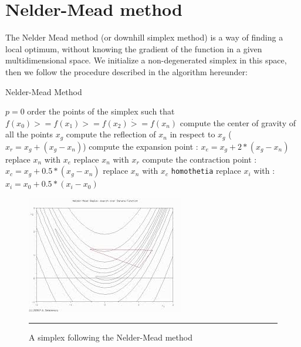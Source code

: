 \section{Nelder-Mead method}

The Nelder Mead method \cite{simplex} (or downhill simplex method) is a way of finding a local optimum, without knowing the gradient of the function in a given multidimensional space. We initialize a non-degenerated simplex in this space, then we follow the procedure described in the algorithm hereunder:

\begin{algorithm}
    \caption{Nelder-Mead Method}
    \begin{algorithmic}
    \STATE $ p = 0 $
        \REPEAT 
            \STATE order the points of the simplex such that $f(x_0) >= f(x_1) >= f(x_2) \dot >= f(x_n)$
            \STATE compute the center of gravity of all the points $x_g$
            \STATE compute the reflection of $x_n$ in respect to $x_g$ ($x_r = x_g + (x_g - x_n )$)
                \STATE compute the expansion point : $x_e = x_g + 2 * (x_g - x_n )$ 
                    \STATE replace $x_n$ with $x_e$ 
                \ELSE
                    \STATE replace $x_n$ with $x_r$ 
                \ENDIF
            \ELSE 
                \STATE compute the contraction point : $x_c = x_g + 0.5 * (x_g - x_n )$ 
                    \STATE replace $x_n$ with $x_c$ 
                \ELSE
                    \STATE \verb?homothetia?
                        \STATE replace $x_i$ with : $x_i = x_0 + 0.5 * (x_i - x_0 )$ 
                    \ENDFOR
                \ENDIF
            \ENDIF
    
    \end{algorithmic}
\end{algorithm}


\begin{figure}[htbp]
    \centering
    \includegraphics[scale=0.7]{Figures/nelder_mead.jpg}
    \rule{35em}{0.5pt}
    \caption[A simplex following the Nelder-Mead method]{A simplex following the Nelder-Mead method}
    \label{fig:nelder_mead}
\end{figure}


